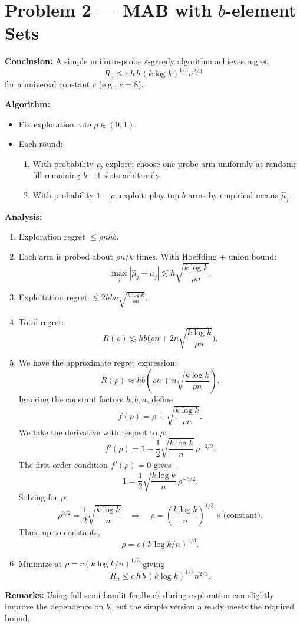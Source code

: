 \documentclass[11pt]{article}
\renewenvironment{shaded}{%
  \def\FrameCommand{\fboxsep=\FrameSep \colorbox{shadecolor}}%
  \MakeFramed{\advance\hsize-\width \FrameRestore\FrameRestore}}%
 {\endMakeFramed}
\begin{document}
\pagebreak

\begin{shaded}
\section{Problem 2 --- MAB with \(b\)-element Sets}

\textbf{Conclusion:} A simple uniform-probe $\varepsilon$-greedy algorithm achieves regret
\[
R_n \le c\,h\,b\,(k\log k)^{1/3}n^{2/3}
\]
for a universal constant \( c \) (e.g., \( c = 8 \)).

\textbf{Algorithm:}
\begin{itemize}
    \item Fix exploration rate \( \rho \in (0,1) \).
    \item Each round:
    \begin{enumerate}
        \item With probability \( \rho \), explore: choose one probe arm uniformly at random; fill remaining \( b-1 \) slots arbitrarily.
        \item With probability \( 1-\rho \), exploit: play top-\( b \) arms by empirical means \( \hat{\mu}_j \).
    \end{enumerate}
\end{itemize}

\textbf{Analysis:}
\begin{enumerate}
    \item Exploration regret \( \le \rho n h b \).
    \item Each arm is probed about \( \rho n / k \) times. With Hoeffding + union bound:
    \[
    \max_j |\hat{\mu}_j - \mu_j| \lesssim h\sqrt{\frac{k\log k}{\rho n}}.
    \]
    \item Exploitation regret \( \lesssim 2h b n\sqrt{\frac{k\log k}{\rho n}}. \)
    \item Total regret:
    \[
    R(\rho) \lesssim h b \Big( \rho n + 2n\sqrt{\frac{k\log k}{\rho n}} \Big).
    \]
    \item We have the approximate regret expression:
\[
R(\rho) \approx h b \left( \rho n + n\sqrt{\frac{k\log k}{\rho n}} \right).
\]
Ignoring the constant factors $h,b,n$, define
\[
f(\rho) = \rho + \sqrt{\frac{k\log k}{\rho n}}.
\]
We take the derivative with respect to $\rho$:
\[
f'(\rho) = 1 - \frac{1}{2}\sqrt{\frac{k\log k}{n}}\,\rho^{-3/2}.
\]
The first order condition $f'(\rho)=0$ gives
\[
1 = \frac{1}{2}\sqrt{\frac{k\log k}{n}}\,\rho^{-3/2}.
\]
Solving for $\rho$:
\[
\rho^{3/2} = \frac{1}{2}\sqrt{\frac{k\log k}{n}}
\quad\Rightarrow\quad
\rho = \left(\frac{k\log k}{n}\right)^{1/3} \times \text{(constant)}.
\]
Thus, up to constants,
\[
\rho = c (k\log k / n)^{1/3}.
\]
    
    \item Minimize at \( \rho =  c(k\log k/n)^{1/3} \) giving
    \[
    R_n \le c\,h\,b\,(k\log k)^{1/3}n^{2/3}.
    \]
\end{enumerate}

\textbf{Remarks:}
Using full semi-bandit feedback during exploration can slightly improve the dependence on \( b \), but the simple version already meets the required bound.

\end{shaded}
\end{document}
